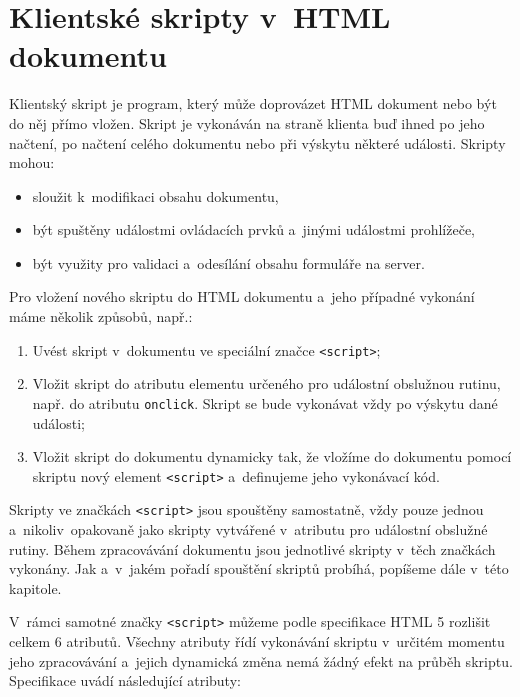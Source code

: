 \section{Klientské skripty v~HTML dokumentu}
\label{Chapter.DependenciesAnalysis.ScriptsInHTML}

Klientský skript je program, který může doprovázet HTML dokument nebo být do něj přímo vložen. Skript je vykonáván na straně klienta buď ihned po jeho načtení, po načtení celého dokumentu nebo při výskytu některé události. Skripty mohou:

\begin{itemize}
  \item sloužit k~modifikaci obsahu dokumentu,
  \item být spuštěny událostmi ovládacích prvků a~jinými událostmi prohlížeče,
  \item být využity pro validaci a~odesílání obsahu formuláře na server.
\end{itemize}

\noindent Pro vložení nového skriptu do HTML dokumentu a~jeho případné vykonání máme několik způsobů, např.:

\begin{enumerate}
  \item Uvést skript v~dokumentu ve speciální značce \texttt{<script>};
  \item Vložit skript do atributu elementu určeného pro událostní obslužnou rutinu, např. do atributu \texttt{onclick}. Skript se bude vykonávat vždy po výskytu dané události;
  \item Vložit skript do dokumentu dynamicky tak, že vložíme do dokumentu pomocí skriptu nový element \texttt{<script>} a~definujeme jeho vykonávací kód.
\end{enumerate}

Skripty ve značkách \texttt{<script>} jsou spouštěny samostatně, vždy pouze jednou a~nikoliv~opakovaně jako skripty vytvářené v~atributu pro událostní obslužné rutiny. Během zpracovávání dokumentu jsou jednotlivé skripty v~těch značkách vykonány. Jak a~v~jakém pořadí spouštění skriptů probíhá, popíšeme dále v~této kapitole.

V~rámci samotné značky \texttt{<script>} můžeme podle specifikace HTML 5 \cite{Bibliography.HTML5.Scripting} rozlišit celkem 6 atributů. Všechny atributy řídí vykonávání skriptu v~určitém momentu jeho zpracovávání a~jejich dynamická změna nemá žádný efekt na průběh skriptu. Specifikace uvádí následující atributy:

